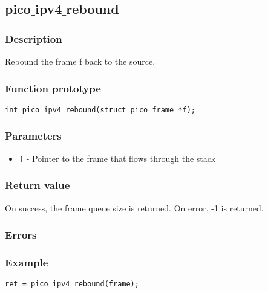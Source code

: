 \subsection{pico$\_$ipv4$\_$rebound}

\subsubsection*{Description}
Rebound the frame f back to the source.

\subsubsection*{Function prototype}
\begin{verbatim}
int pico_ipv4_rebound(struct pico_frame *f);
\end{verbatim}

\subsubsection*{Parameters}
\begin{itemize}[noitemsep]
\item \texttt{f} - Pointer to the frame that flows through the stack
\end{itemize}

\subsubsection*{Return value}
On success, the frame queue size is returned. On error, -1 is returned.

\subsubsection*{Errors}

\subsubsection*{Example}
\begin{verbatim}
ret = pico_ipv4_rebound(frame);
\end{verbatim}
